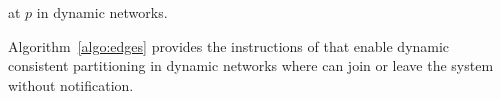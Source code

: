 \begin{algorithm}
  
  \caption{\label{algo:edges}\NAME at \Process $p$ in dynamic networks.}
\end{algorithm}

Algorithm~\ref{algo:edges} provides the instructions of \NAME that
enable dynamic consistent partitioning in dynamic networks where
\processes can join or leave the system without
notification. 








